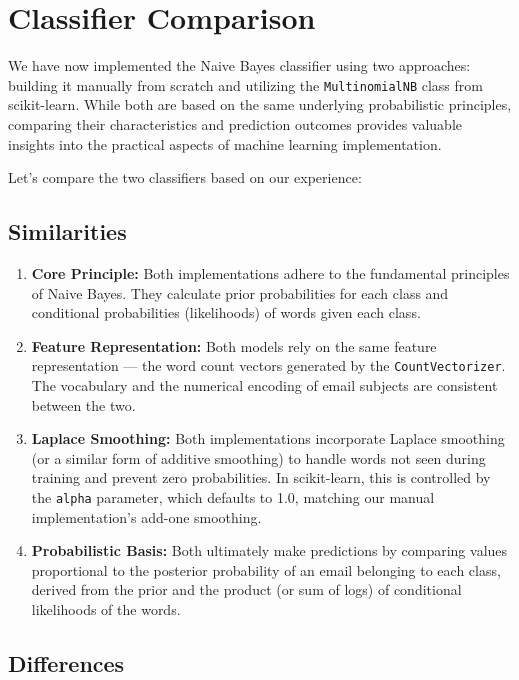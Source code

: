 \documentclass[12pt,letterpaper]{article}
\begin{document}
\section{Classifier Comparison}

We have now implemented the Naive Bayes classifier using two approaches: building it manually from scratch and utilizing the \texttt{MultinomialNB} class from scikit-learn. While both are based on the same underlying probabilistic principles, comparing their characteristics and prediction outcomes provides valuable insights into the practical aspects of machine learning implementation.

Let's compare the two classifiers based on our experience:

\subsection{Similarities}

\begin{enumerate}
    \item \textbf{Core Principle:} Both implementations adhere to the fundamental principles of Naive Bayes. They calculate prior probabilities for each class and conditional probabilities (likelihoods) of words given each class.
    
    \item \textbf{Feature Representation:} Both models rely on the same feature representation --- the word count vectors generated by the \texttt{CountVectorizer}. The vocabulary and the numerical encoding of email subjects are consistent between the two.
    
    \item \textbf{Laplace Smoothing:} Both implementations incorporate Laplace smoothing (or a similar form of additive smoothing) to handle words not seen during training and prevent zero probabilities. In scikit-learn, this is controlled by the \texttt{alpha} parameter, which defaults to 1.0, matching our manual implementation's add-one smoothing.
    
    \item \textbf{Probabilistic Basis:} Both ultimately make predictions by comparing values proportional to the posterior probability of an email belonging to each class, derived from the prior and the product (or sum of logs) of conditional likelihoods of the words.
\end{enumerate}

\subsection{Differences}
\end{document}
